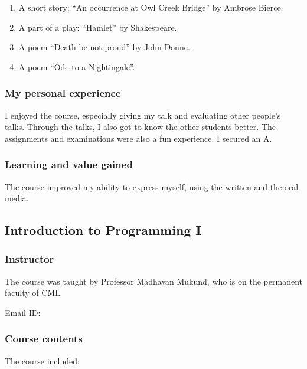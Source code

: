 \documentclass[a4paper]{amsart}
\begin{document}
\begin{enumerate}

\item A short story: ``An occurrence at Owl Creek Bridge'' by Ambrose Bierce.

\item A part of a play: ``Hamlet'' by Shakespeare.

\item A poem ``Death be not proud'' by John Donne.

\item A poem ``Ode to a Nightingale''.

\end{enumerate}

\subsubsection{My personal experience}

I enjoyed the course, especially giving my talk and evaluating other people's talks. Through the talks, I also got
to know the other students better. The assignments and examinations were also a fun experience. I secured an A.

\subsubsection{Learning and value gained}

The course improved my ability to express myself, using the written and the oral media.

\subsection{Introduction to Programming I}\label{prog1}

\subsubsection{Instructor}

The course was taught by Professor Madhavan Mukund, who is on the permanent faculty of
CMI.

Email ID: 

\subsubsection{Course contents}

The course included:
\end{document}
